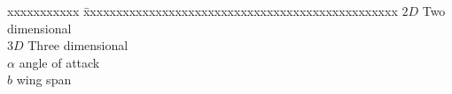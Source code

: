 \abbreviations
\begin{singlespace}
\begin{tabbing}
xxxxxxxxxxx \= xxxxxxxxxxxxxxxxxxxxxxxxxxxxxxxxxxxxxxxxxxxxxxxx \kill
\textbf{$2D$} \indent \> \indent Two dimensional  \\
\textbf{$3D$} \indent \> \indent Three dimensional  \\
\textbf{$\alpha$} \indent \> \indent angle of attack  \\
\textbf{$b$} \indent \> \indent wing span
\end{tabbing}
\end{singlespace}
